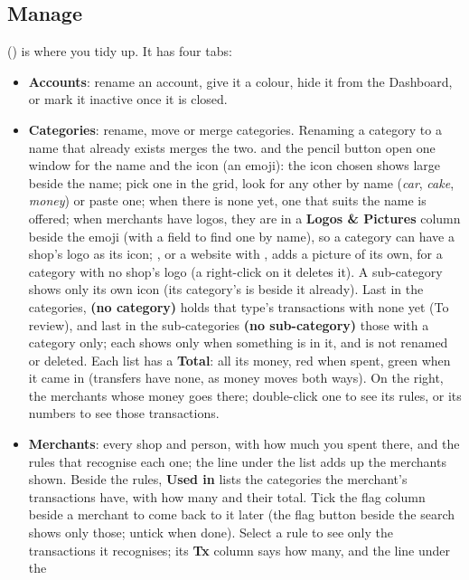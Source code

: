 \documentclass[11pt]{article}
\begin{document}
\subsection{Manage}
 () is where you tidy up. It has four tabs:
\begin{itemize}
  \item \textbf{Accounts}: rename an account, give it a colour, hide it from the Dashboard, or mark it
        inactive once it is closed.
  \item \textbf{Categories}: rename, move or merge categories. Renaming a category to a name that
        already exists merges the two. \button{+} and the pencil button open one window for the name and the
        icon (an emoji): the icon chosen shows large beside the name; pick one in the grid, look for
        any other by name (\emph{car}, \emph{cake}, \emph{money}) or paste one; when there is none yet,
        one that suits the name is offered; when merchants have logos, they are in a \textbf{Logos \& Pictures} column
        beside the emoji (with a field to find one by name), so a category can have a shop's logo as its
        icon; , or a website with , adds a picture of its own, for a
        category with no shop's logo (a right-click on it deletes it). A sub-category shows only
        its own icon (its category's is beside it already). Last in the categories,
        \textbf{(no category)} holds that type's transactions with none yet (To review), and last in the
        sub-categories \textbf{(no sub-category)} those with a category only; each shows only when
        something is in it, and is not renamed or deleted. Each list has a \textbf{Total}: all its
        money, red when spent, green when it came in (transfers have none, as money moves both
        ways). On the right, the merchants whose money
        goes there; double-click one to see its rules, or its numbers to see those transactions.
  \item \textbf{Merchants}: every shop and person, with how much you spent there, and the rules that
        recognise each one; the line under the list adds up the merchants shown. Beside the rules,
        \textbf{Used in} lists the categories the merchant's transactions have, with how many and
        their total. Tick the flag column beside a merchant to come back to it later (the flag button
        beside the search shows only those; untick when done). Select a rule to see only the
        transactions it recognises; its \textbf{Tx} column says how many, and the line under the

\end{itemize}
\end{document}
